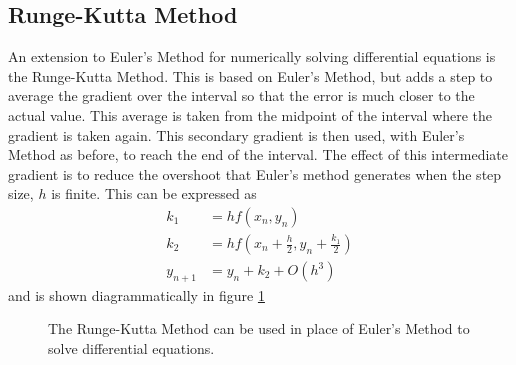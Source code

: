 \documentclass[11pt]{article} %
\begin{document}
\subsection{Runge-Kutta Method}
An extension to Euler's Method for numerically solving differential equations is the Runge-Kutta Method. This is based on Euler's Method, but adds a step to average the gradient over the interval so that the error is much closer to the actual value. This average is taken from the midpoint of the interval where the gradient is taken again. This secondary gradient is then used, with Euler's Method as before, to reach the end of the interval. The effect of this intermediate gradient is to reduce the overshoot that Euler's method generates when the step size, $h$ is finite. This can be expressed as 
\begin{align*}
	k_1 &= hf(x_n,y_n) \\
	k_2 &= hf(x_n + \frac{h}{2}, y_n + \frac{k_1}{2}) \\
	y_{n+1} &= y_n + k_2 +O(h^3)
\end{align*}
and is shown diagrammatically in figure \ref{fig:rungekutta}
\begin{figure}[ht]
	\centering
	
	\caption{\label{fig:rungekutta}The Runge-Kutta Method can be used in place of Euler's Method to solve differential equations.} 
\end{figure}
\end{document}
